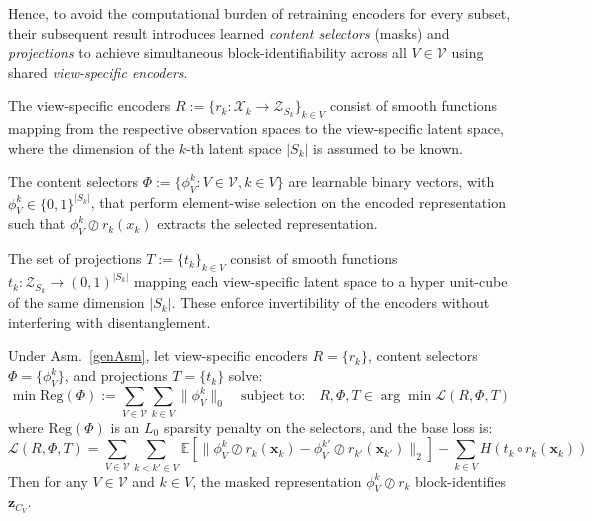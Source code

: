 \documentclass[a4paper,12pt]{article}
\begin{document}
Hence, to avoid the computational burden of retraining encoders for every subset, their subsequent result introduces learned \textit{content selectors} (masks) and \textit{projections} to achieve simultaneous block-identifiability across all $V \in \mathcal{V}$ using shared \textit{view-specific encoders}.

\begin{definition}
  \label{def:view_enc}
  The view-specific encoders $R := \{r_k : \mathcal{X}_k \rightarrow \mathcal{Z}_{S_k}\}_{k \in V}$ consist of smooth functions mapping from the respective observation spaces to the view-specific latent space, where the dimension of the $k$-th latent space $|S_k|$ is assumed to be known.
\end{definition}

\begin{definition}
  \label{def:content_select}
  The content selectors $\Phi := \{\phi_V^k : V \in \mathcal{V}, k \in V\}$ are learnable binary vectors, with $\phi_V^k \in \{0, 1\}^{|S_k|}$, that perform element-wise selection on the encoded representation such that $\phi_V^k \oslash r_k(x_k)$ extracts the selected representation.
\end{definition}

\begin{definition}[Projections]
  \label{def:proj}
  The set of projections $T := \{t_k\}_{k \in V}$ consist of smooth functions $t_k : \mathcal{Z}_{S_k} \rightarrow (0, 1)^{|S_k|}$ mapping each view-specific latent space to a hyper unit-cube of the same dimension $|S_k|$. These enforce invertibility of the encoders without interfering with disentanglement.
\end{definition}

\begin{theorem} \label{thm:allContBlocks}
  Under Asm.\ \ref{genAsm}, let view-specific encoders $R = \{r_k\}$, content selectors $\Phi = \{\phi_V^k\}$, and projections $T = \{t_k\}$ solve:
  \begin{equation}
    \min \text{Reg}(\Phi) := \sum_{V \in \mathcal{V}} \sum_{k \in V} \| \phi_V^{k} \|_0 \quad \text{subject to:} \quad R, \Phi, T \in \arg\min \mathcal{L}(R, \Phi, T)
  \end{equation}
  where $\text{Reg}(\Phi)$ is an $L_0$ sparsity penalty on the selectors, and the base loss is:
  \begin{equation}
    \mathcal{L}(R, \Phi, T) = \sum_{V \in \mathcal{V}} \sum_{k < k' \in V} \mathbb{E} \left[ \|\phi_V^k \oslash r_k(\mathbf{x}_k) - \phi_V^{k'} \oslash r_{k'}(\mathbf{x}_{k'})\|_2 \right] - \sum_{k \in V} H(t_k \circ r_k(\mathbf{x}_k))
  \end{equation}
  Then for any $V \in \mathcal{V}$ and $k \in V$, the masked representation $\phi_V^k \oslash r_k$ block-identifies $\mathbf{z}_{C_V}$.
\end{theorem}
\end{document}

